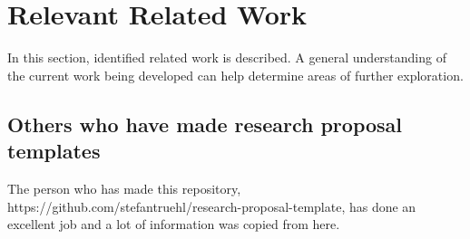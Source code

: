 \documentclass{IEEEtran}
\begin{document}
\section{Relevant Related Work}
    {In this section, identified related work is described. A general understanding of the current work being developed can help determine areas of further exploration.}
    \subsection{Others who have made research proposal templates}
        {The person who has made this repository, https://github.com/stefantruehl/research-proposal-template, has done an excellent job and a lot of information was copied from here.}


  \newpage
  \printbibliography
\end{document}
